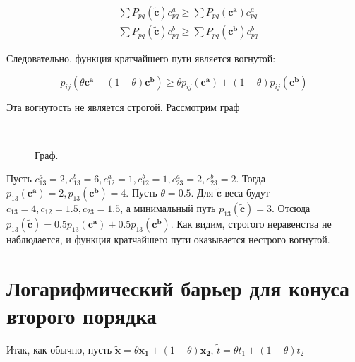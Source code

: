 	\begin{equation}
	\begin{split}
	&\sum P_{pq}(\mathbf{\tilde{c}}) c_{pq}^a \geqslant \sum P_{pq}(\mathbf{c^a})
	c_{pq}^a \\
	&\sum P_{pq}(\mathbf{\tilde{c}}) c_{pq}^b \geqslant \sum P_{pq}(\mathbf{c^b})
	c_{pq}^b
	\end{split}
	\end{equation}	
	
	Следовательно, функция кратчайшего пути является вогнутой:
	
	\begin{equation}
	p_{ij}(\theta \mathbf{c^a} + (1 - \theta) \mathbf{c^b}) \geqslant \theta
	p_{ij}( \mathbf{c^a}) + (1-\theta ) p_{ij}( \mathbf{c^b}) 
	\end{equation}
	
	Эта вогнутость не является строгой. Рассмотрим граф
	
	\begin{figure}[H]
		\\
		\caption{Граф.}
	\end{figure}
	
	Пусть $c_{13}^a = 2, c_{13}^b = 6, c_{12}^a = 1, c_{12}^b = 1, c_{23}^a = 2,
	c_{23}^b = 2$. Тогда $p_{13}(\mathbf{c^a}) = 2, p_{13}(\mathbf{c^b}) = 4$. Пусть
	$\theta = 0.5$. Для $\mathbf{\tilde{c}}$ веса будут $c_{13} = 4, c_{12} = 1.5,
	c_{23} = 1.5$, а минимальный путь $p_{13}(\mathbf{\tilde{c}}) = 3$. Отсюда
	$p_{13}(\mathbf{\tilde{c}}) = 0.5 p_{13}(\mathbf{c^a}) + 0.5
	p_{13}(\mathbf{c^b}) $. Как видим, строгого неравенства не наблюдается, и
	функция кратчайшего пути оказывается нестрого вогнутой.
	
	\section{Логарифмический барьер для конуса второго порядка}
	
	Итак, как обычно, пусть $\mathbf{\tilde{x}} = \theta \mathbf{x_1} +  (1 -
	\theta) \mathbf{x_2}$, $\tilde{t} = \theta t_1 + (1 - \theta) t_2$
	
